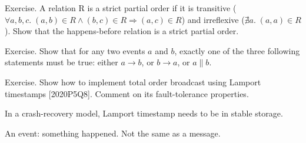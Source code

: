 Exercise. A relation R is a strict partial order if it is transitive ($\forall a,b,c.\; (a,b) \in R \wedge (b,c) \in R \Longrightarrow (a,c) \in R$) and irreflexive ($\nexists a.\; (a,a) \in R$). Show that the happens-before relation is a strict partial order.

Exercise. Show that for any two events $a$ and $b$, exactly one of the three following statements must be true: either $a \rightarrow b$, or $b \rightarrow a$, or $a \parallel b$.

Exercise. Show how to implement total order broadcast using Lamport timestamps [2020P5Q8]. Comment on its fault-tolerance properties.

In a crash-recovery model, Lamport timestamp needs to be in stable storage.

An event: something happened. Not the same as a message.








